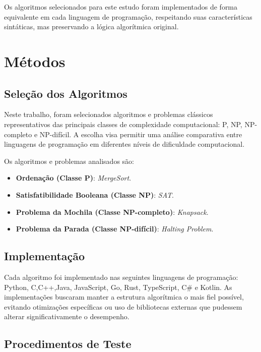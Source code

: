 \documentclass[12pt,oneside,a4paper]{report}
\begin{document}
Os algoritmos selecionados para este estudo foram implementados de forma equivalente em cada linguagem de programação, respeitando suas características sintáticas, mas preservando a lógica algorítmica original.

\section{Métodos}

\subsection{Seleção dos Algoritmos}

Neste trabalho, foram selecionados algoritmos e problemas clássicos representativos das principais classes de complexidade computacional: P, NP, NP-completo e NP-difícil. A escolha visa permitir uma análise comparativa entre linguagens de programação em diferentes níveis de dificuldade computacional.

Os algoritmos e problemas analisados são:

\begin{itemize}
    \item \textbf{Ordenação (Classe P)}: \textit{MergeSort}.
    
    \item \textbf{Satisfatibilidade Booleana (Classe NP)}: \textit{SAT}.
    
    \item \textbf{Problema da Mochila (Classe NP-completo)}: \textit{Knapsack}.
    
    \item \textbf{Problema da Parada (Classe NP-difícil)}: \textit{Halting Problem}.
\end{itemize}

\subsection{Implementação}

Cada algoritmo foi implementado nas seguintes linguagens de programação:
Python, C,C++,Java, JavaScript, Go, Rust, TypeScript, C\# e Kotlin.  
As implementações buscaram manter a estrutura algorítmica o mais fiel possível, evitando otimizações específicas ou uso de bibliotecas externas que pudessem alterar significativamente o desempenho.

\subsection{Procedimentos de Teste}
\end{document}
